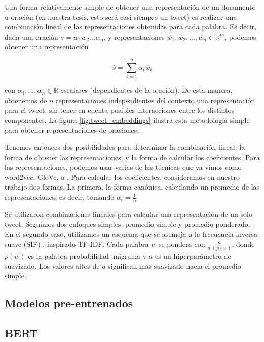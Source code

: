 Una forma relativamente simple de obtener una representación de un documento u oración (en nuestra tesis, esto será casi siempre un tweet) es realizar una combinación lineal de las representaciones obtenidas para cada palabra. Es decir, dada una oración $s = w_1 w_2 \ldots w_n$, y representaciones $\overline{w_1}, \overline{w_2}, \ldots, \overline{w_n} \in \mathbb{R}^m$, podemos obtener una representación

\begin{equation}
    \overline{s} = \sum\limits_{i=1}^{n} \alpha_i \overline{w_i}
\end{equation}

con $\alpha_1, \ldots, \alpha_n \in \mathbb{R}$ escalares (dependientes de la oración). De esta manera, obtenemos de $n$ representaciones independientes del contexto una representación para el tweet, sin tener en cuenta posibles interacciones entre los distintos componentes. La figura \ref{fig:tweet_embeddings} ilustra esta metodología simple para obtener representaciones de oraciones.

Tenemos entonces dos posibilidades para determinar la combinación lineal: la forma de obtener las representaciones, y la forma de calcular los coeficientes. Para las representaciones, podemos usar varias de las técnicas que ya vimos como word2vec, GloVe, o \fasttext{}. Para calcular los coeficientes, consideramos en nuestro trabajo dos formas. La primera, la forma canónica, calculando un promedio de las representaciones, es decir, tomando $\alpha_i = \frac{1}{n}$

Se utilizaron combinaciones lineales para calcular una representación de un solo tweet.
Seguimos dos enfoques simples: promedio simple y promedio ponderado. En el segundo caso, utilizamos un esquema que se asemeja a la frecuencia inversa suave (SIF) \cite{arora17}, inspirado TF-IDF.
Cada palabra $ w $ se pondera con $ \frac {a} {a + p (w)} $, donde $ p (w) $ es la palabra probabilidad unigrama y $ a $ es un hiperparámetro de suavizado.
Los valores altos de $ a $ significan más suavizado hacia el promedio simple.


\subsection{Modelos pre-entrenados}

\subsection{BERT}
\label{sec:02_preliminar_bert}

